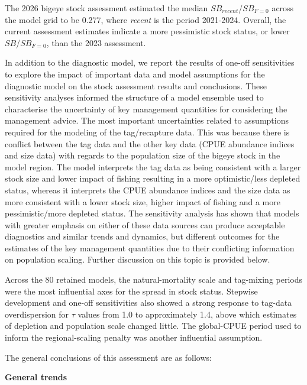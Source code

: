 \documentclass[
  english,
  a4paper,
  a4paper,
  11pt]{SCreport}
\begin{document}
The 2026 bigeye stock assessment estimated the median
\(SB_{recent}\)/\(SB_{F=0}\) across the model grid to be 0.277, where
\emph{recent} is the period 2021-2024. Overall, the current assessment
estimates indicate a more pessimistic stock status, or lower
\(SB\)/\(SB_{F=0}\), than the 2023 assessment.

In addition to the diagnostic model, we report the results of one-off
sensitivities to explore the impact of important data and model
assumptions for the diagnostic model on the stock assessment results and
conclusions. These sensitivity analyses informed the structure of a
model ensemble used to characterise the uncertainty of key management
quantities for considering the management advice. The most important
uncertainties related to assumptions required for the modeling of the
tag/recapture data. This was because there is conflict between the tag
data and the other key data (CPUE abundance indices and size data) with
regards to the population size of the bigeye stock in the model region.
The model interprets the tag data as being consistent with a larger
stock size and lower impact of fishing resulting in a more
optimistic/less depleted status, whereas it interprets the CPUE
abundance indices and the size data as more consistent with a lower
stock size, higher impact of fishing and a more pessimistic/more
depleted status. The sensitivity analysis has shown that models with
greater emphasis on either of these data sources can produce acceptable
diagnostics and similar trends and dynamics, but different outcomes for
the estimates of the key management quantities due to their conflicting
information on population scaling. Further discussion on this topic is
provided below.

Across the 80 retained models, the natural-mortality scale and
tag-mixing periods were the most influential axes for the spread in
stock status. Stepwise development and one-off sensitivities also showed
a strong response to tag-data overdispersion for \(\tau\) values from
1.0 to approximately 1.4, above which estimates of depletion and
population scale changed little. The global-CPUE period used to inform
the regional-scaling penalty was another influential assumption.

The general conclusions of this assessment are as follows:

\textbf{General trends}
\end{document}
